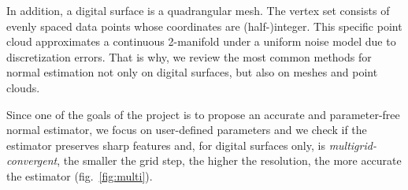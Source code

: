 In addition, a digital surface is a quadrangular mesh. The vertex set consists of evenly spaced data points
whose coordinates are (half-)integer. This specific point cloud approximates a continuous 2-manifold under a
uniform noise model due to discretization errors. That is why, we review the most common methods for normal estimation
not only on digital surfaces, but also on meshes and point clouds.



Since one of the goals of the project is to propose an accurate and parameter-free normal estimator,
we focus on user-defined parameters and we check if the estimator preserves sharp features and,
for digital surfaces only, is \emph{multigrid-convergent}, \ie the smaller the grid step,
the higher the resolution, the more accurate the estimator (fig.~\ref{fig:multi}). 

